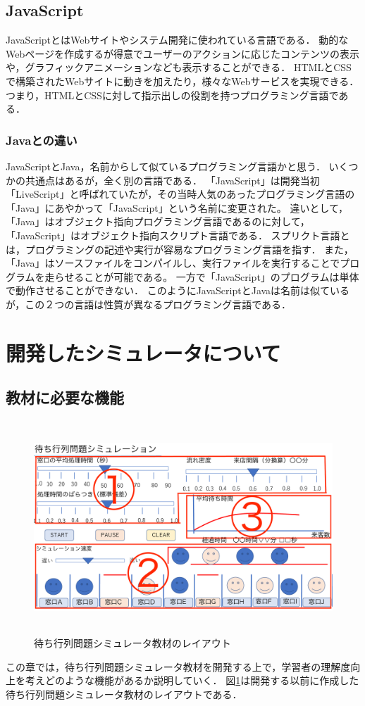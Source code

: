 \documentclass[12pt,a4j]{ltjsarticle}
\begin{document}
\clearpage

\subsection{JavaScript}
JavaScriptとはWebサイトやシステム開発に使われている言語である\cite{js}．
動的なWebページを作成するが得意でユーザーのアクションに応じたコンテンツの表示や，グラフィックアニメーションなども表示することができる．
HTMLとCSSで構築されたWebサイトに動きを加えたり，様々なWebサービスを実現できる．
つまり，HTMLとCSSに対して指示出しの役割を持つプログラミング言語である．

\subsubsection{Javaとの違い}
JavaScriptとJava，名前からして似ているプログラミング言語かと思う．
いくつかの共通点はあるが，全く別の言語である．
「JavaScript」は開発当初「LiveScript」と呼ばれていたが，その当時人気のあったプログラミング言語の「Java」にあやかって「JavaScript」という名前に変更された。
違いとして，「Java」はオブジェクト指向プログラミング言語であるのに対して，「JavaScript」はオブジェクト指向スクリプト言語である．
スプリクト言語とは，プログラミングの記述や実行が容易なプログラミング言語を指す．
また，「Java」はソースファイルをコンパイルし、実行ファイルを実行することでプログラムを走らせることが可能である。
一方で「JavaScript」のプログラムは単体で動作させることができない．
このようにJavaScriptとJavaは名前は似ているが，この２つの言語は性質が異なるプログラミング言語である．
\clearpage

\section{開発したシミュレータについて}
\subsection{教材に必要な機能} 
\begin{figure}[h]
\begin{center}
\includegraphics[height = 80mm ]{figures/simulator_layout.pdf}
\caption{待ち行列問題シミュレータ教材のレイアウト}
\label{fig:layout}
\end{center}
\end{figure}
この章では，待ち行列問題シミュレータ教材を開発する上で，学習者の理解度向上を考えどのような機能があるか説明していく．
図\ref{fig:layout}は開発する以前に作成した待ち行列問題シミュレータ教材のレイアウトである．
\end{document}
